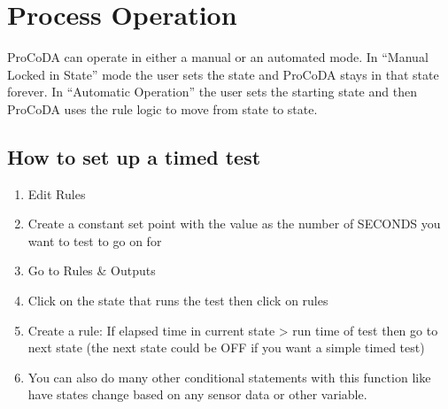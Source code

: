 \documentclass[letterpaper,10pt,english]{sphinxmanual}
\begin{document}
\section{Process Operation}
\label{\detokenize{ProCoDA/ProCoDA:process-operation}}\label{\detokenize{ProCoDA/ProCoDA:heading-procoda-process-operation}}
ProCoDA can operate in either a manual or an automated mode. In “Manual Locked in State” mode the user sets the state and ProCoDA stays in that state forever. In “Automatic Operation” the user sets the starting state and then ProCoDA uses the rule logic to move from state to state.


\subsection{How to set up a timed test}
\label{\detokenize{ProCoDA/ProCoDA:how-to-set-up-a-timed-test}}\begin{enumerate}
\item {} 
Edit Rules

\item {} 
Create a constant set point with the value as the number of SECONDS you want to test to go on for

\item {} 
Go to Rules \& Outputs

\item {} 
Click on the state that runs the test then click on rules

\item {} 
Create a rule: If elapsed time in current state \textgreater{} run time of test then go to next state (the next state could be OFF if you want a simple timed test)

\item {} 
You can also do many other conditional statements with this function like have states change based on any sensor data or other variable.

\end{enumerate}
\end{document}
